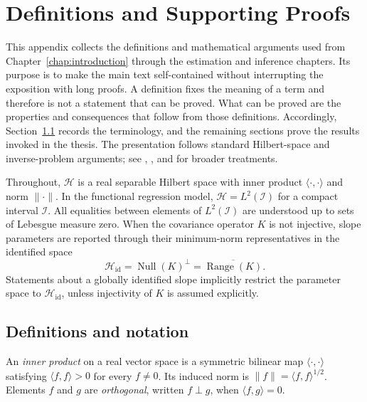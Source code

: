 \chapter{Definitions and Supporting Proofs}
\label{app:mathematical-proofs}

This appendix collects the definitions and mathematical arguments used from
Chapter~\ref{chap:introduction} through the estimation and inference
chapters.  Its purpose is to
make the main text self-contained without interrupting the exposition with
long proofs.  A definition fixes the meaning of a term and therefore is not a
statement that can be proved.  What can be proved are the properties and
consequences that follow from those definitions.  Accordingly,
Section~\ref{sec:app-definitions} records the terminology, and the remaining
sections prove the results invoked in the thesis.  The presentation follows
standard Hilbert-space and inverse-problem arguments; see
\textcite{lin_mit_18102_2021}, \textcite{hsing_eubank_2015}, and
\textcite{engl_hanke_neubauer_1996} for broader treatments.

Throughout, $\mathcal H$ is a real separable Hilbert space with inner product
$\langle\cdot,\cdot\rangle$ and norm $\|\cdot\|$.  In the functional
regression model, $\mathcal H=L^2(\mathcal I)$ for a compact interval
$\mathcal I$.  All equalities between elements of $L^2(\mathcal I)$ are
understood up to sets of Lebesgue measure zero.
When the covariance operator $K$ is not injective, slope parameters are
reported through their minimum-norm representatives in the identified space
\[
    \mathcal H_{\mathrm{id}}
    =\operatorname{Null}(K)^\perp
    =\overline{\operatorname{Range}(K)}.
\]
Statements about a globally identified slope implicitly restrict the
parameter space to $\mathcal H_{\mathrm{id}}$, unless injectivity of $K$ is
assumed explicitly.

\section{Definitions and notation}
\label{sec:app-definitions}

\begin{definition}
An \emph{inner product} on a real vector space is a symmetric bilinear map
$\langle\cdot,\cdot\rangle$ satisfying $\langle f,f\rangle>0$ for every
$f\neq0$.  Its induced norm is $\|f\|=\langle f,f\rangle^{1/2}$.  Elements
$f$ and $g$ are \emph{orthogonal}, written $f\perp g$, when
$\langle f,g\rangle=0$.
\end{definition}

